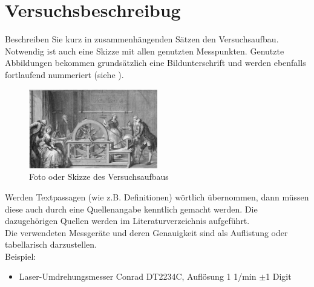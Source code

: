 \section{Versuchsbeschreibug}
\label{section:Versuchsbeschreibung}
Beschreiben Sie kurz in zusammenhängenden Sätzen den Versuchsaufbau. Notwendig ist auch eine Skizze mit allen genutzten Messpunkten. Genutzte Abbildungen bekommen grundsätzlich eine Bildunterschrift und werden ebenfalls fortlaufend nummeriert (siehe ).\\

%
\begin{figure}[!h]
		\centering
		\includegraphics[width=0.5\textwidth]{Abbildungen/Beispielbild_Versuchsaufbau.eps}
		\caption{Foto oder Skizze des Versuchsaufbaus \cite{SPM20}}
		\label{fig:BspVers}
\end{figure}
%
Werden Textpassagen (wie z.B. Definitionen) wörtlich übernommen, dann müssen diese auch durch eine Quellenangabe kenntlich gemacht werden. Die dazugehörigen Quellen werden im Literaturverzeichnis aufgeführt.\\

Die verwendeten Messgeräte und deren Genauigkeit sind als Auflistung oder tabellarisch darzustellen.\\

Beispiel:
%
\begin{itemize}
\item Laser-Umdrehungsmesser Conrad DT2234C, Auflösung 1 1/min $\pm$1 Digit
\end{itemize}
%
